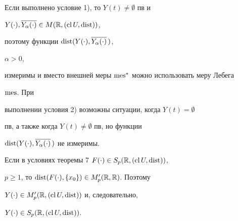 \begin{note}


Если выполнено условие 1), то $Y(t)\ne\emptyset$ пв и


$Y(\cdot),\overline{Y_\alpha(\cdot)}\in M(\Bbb R,(\operatorname{cl} U,\operatorname{dist}))$,


поэтому функции $\operatorname{dist}(Y(\cdot),\overline{Y_\alpha(\cdot)}\,)$,


$\alpha>0$,


измеримы и вместо внешней меры $\operatorname{mes}^*$ можно использовать меру Лебега


$\operatorname{mes}$. При


выполнении условия 2) возможны ситуации, когда $Y(t)=\emptyset$


пв, а также когда $Y(t)\ne\emptyset$ пв, но функции


$\operatorname{dist}(Y(\cdot),\overline{Y_\alpha(\cdot)}\,)$ не измеримы.


\end{note}





\begin{note}


Если в условиях теоремы 7\; $F(\cdot)\in S_p(\Bbb R,(\operatorname{cl} U,\operatorname{dist}))$,


$p\ge 1$, то $\operatorname{dist}(F(\cdot),\{x_0\})\in M'_p(\Bbb R,\Bbb R)$. Поэтому


$Y(\cdot)\in M'_p(\Bbb R,(\operatorname{cl} U,\operatorname{dist}))$ и, следовательно,


$Y(\cdot)\in S_p(\Bbb R,(\operatorname{cl} U,\operatorname{dist}))$.


\end{note}


\addtocounter{cor}{-2}





